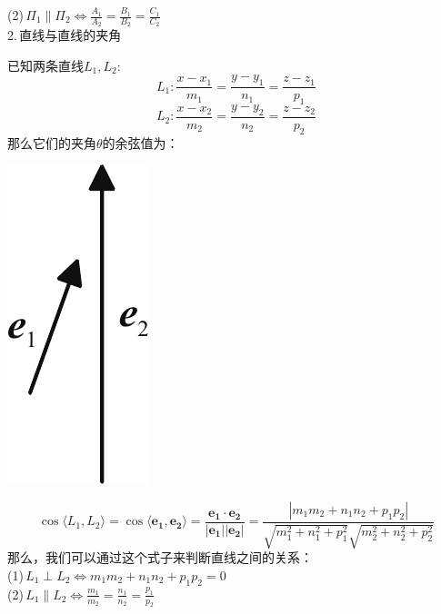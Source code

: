 \noindent
\begin{minipage}{0.7\linewidth}
(2)$\, \Pi_1\parallel \Pi_2 \Leftrightarrow \displaystyle \frac{A_1}{A_2}=\frac{B_1}{B_2}=\frac{C_1}{C_2} $\vspace*{-0.5em}\\

2.$\,$直线与直线的夹角
\par 已知两条直线$L_1,L_2$:
\begin{equation}
	L_1: \frac{x-x_1}{m_1}=\frac{y-y_1}{n_1}=\frac{z-z_1}{p_1}
\end{equation}
\begin{equation}
	L_2:\frac{x-x_2}{m_2}=\frac{y-y_2}{n_2}=\frac{z-z_2}{p_2}
\end{equation}
那么它们的夹角$\theta$的余弦值为：
\end{minipage}
\begin{minipage}{0.35\linewidth}
	\centering
	\includegraphics[width = 0.3\linewidth]{pic/C-5/lineang}
	\vspace*{-1em}
	\label{直线与直线的夹角}
\end{minipage}

\begin{equation}
\cos\langle L_1,L_2\rangle =\cos \langle \boldsymbol{e_1},\boldsymbol{e_2}\rangle =\frac{\boldsymbol{e_1}\cdot\boldsymbol{e_2}}{|\boldsymbol{e_1}||\boldsymbol{e_2}|}=\frac{|m_1m_2+n_1n_2+p_1p_2|}{\sqrt{m_1^2+n_1^2+p_1^2}\sqrt{m_2^2+n_2^2+p_2^2}}
\end{equation}
那么，我们可以通过这个式子来判断直线之间的关系：\\
(1)$\, L_1\perp L_2 \Leftrightarrow  m_1m_2+n_1n_2+p_1p_2=0$\\
(2)$\, L_1\parallel L_2 \Leftrightarrow \displaystyle \frac{m_1}{m_2}=\frac{n_1}{n_2}=\frac{p_1}{p_2} $\\

